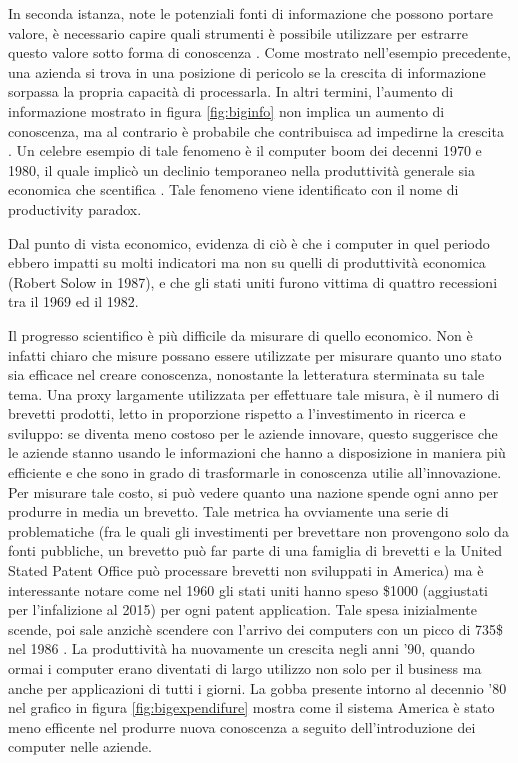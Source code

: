 \documentclass[]{book}
\begin{document}
In seconda istanza, note le potenziali fonti di informazione che possono
portare valore, è necessario capire quali strumenti è possibile
utilizzare per estrarre questo valore sotto forma di
conoscenza\citep[\citet{mining2006data}]{hand2007principles} . Come
mostrato nell'esempio precedente, una azienda si trova in una posizione
di pericolo se la crescita di informazione sorpassa la propria capacità
di processarla. In altri termini, l'aumento di informazione mostrato in
figura \ref{fig:biginfo} non implica un aumento di conoscenza, ma al
contrario è probabile che contribuisca ad impedirne la crescita
\citep[\citet{herbig1994effect}]{allen2003information}. Un celebre
esempio di tale fenomeno è il computer boom dei decenni 1970 e 1980, il
quale implicò un declinio temporaneo nella produttività generale sia
economica che scentifica \citep{solow1987we}. Tale fenomeno viene
identificato con il nome di productivity paradox.

Dal punto di vista economico, evidenza di ciò è che i computer in quel
periodo ebbero impatti su molti indicatori ma non su quelli di
produttività economica (Robert Solow in 1987), e che gli stati uniti
furono vittima di quattro recessioni tra il 1969 ed il
1982\citep{national2010us}.

Il progresso scientifico è più difficile da misurare di quello
economico\citep[\citet{hauschildt1991towards},
\citet{van2000evaluation}, \citet{erno2011measuring},
\citet{bornmann2013societal}, \citet{bornmann2014evaluate},
\citet{bornmann2017does}]{hirsch2005index}. Non è infatti chiaro che
misure possano essere utilizzate per misurare quanto uno stato sia
efficace nel creare conoscenza, nonostante la letteratura sterminata su
tale tema. Una proxy largamente utilizzata per effettuare tale misura, è
il numero di brevetti prodotti, letto in proporzione rispetto a
l'investimento in ricerca e sviluppo: se diventa meno costoso per le
aziende innovare, questo suggerisce che le aziende stanno usando le
informazioni che hanno a disposizione in maniera più efficiente e che
sono in grado di trasformarle in conoscenza utilie all'innovazione. Per
misurare tale costo, si può vedere quanto una nazione spende ogni anno
per produrre in media un brevetto. Tale metrica ha ovviamente una serie
di problematiche (fra le quali gli investimenti per brevettare non
provengono solo da fonti pubbliche, un brevetto può far parte di una
famiglia di brevetti e la United Stated Patent Office può processare
brevetti non sviluppati in America) ma è interessante notare come nel
1960 gli stati uniti hanno speso \$1000 (aggiustati per l'infalizione al
2015) per ogni patent application. Tale spesa inizialmente scende, poi
sale anzichè scendere con l'arrivo dei computers con un picco di 735\$
nel 1986 \citep{silver2012signal}. La produttività ha nuovamente un
crescita negli anni '90, quando ormai i computer erano diventati di
largo utilizzo non solo per il business ma anche per applicazioni di
tutti i giorni. La gobba presente intorno al decennio '80 nel grafico in
figura \ref{fig:bigexpendifure} mostra come il sistema America è stato
meno efficente nel produrre nuova conoscenza a seguito dell'introduzione
dei computer nelle aziende.
\end{document}
